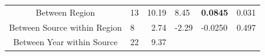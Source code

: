 \begin{longtable}[]{@{}clrllc@{}}
\begin{minipage}[b]{0.07\columnwidth}
\end{minipage}\tabularnewline
\midrule
\endhead
\begin{minipage}[t]{0.32\columnwidth}\centering\strut
Between Region\strut
\end{minipage} & \begin{minipage}[t]{0.06\columnwidth}\raggedright\strut
13\strut
\end{minipage} & \begin{minipage}[t]{0.07\columnwidth}\raggedleft\strut
10.19\strut
\end{minipage} & \begin{minipage}[t]{0.13\columnwidth}\raggedright\strut
8.45\strut
\end{minipage} & \begin{minipage}[t]{0.19\columnwidth}\raggedright\strut
\textbf{0.0845}\strut
\end{minipage} & \begin{minipage}[t]{0.07\columnwidth}\centering\strut
0.031\strut
\end{minipage}\tabularnewline
\begin{minipage}[t]{0.32\columnwidth}\centering\strut
Between Source within Region\strut
\end{minipage} & \begin{minipage}[t]{0.06\columnwidth}\raggedright\strut
8\strut
\end{minipage} & \begin{minipage}[t]{0.07\columnwidth}\raggedleft\strut
2.74\strut
\end{minipage} & \begin{minipage}[t]{0.13\columnwidth}\raggedright\strut
-2.29\strut
\end{minipage} & \begin{minipage}[t]{0.19\columnwidth}\raggedright\strut
-0.0250\strut
\end{minipage} & \begin{minipage}[t]{0.07\columnwidth}\centering\strut
0.497\strut
\end{minipage}\tabularnewline
\begin{minipage}[t]{0.32\columnwidth}\centering\strut
Between Year within Source\strut
\end{minipage} & \begin{minipage}[t]{0.06\columnwidth}\raggedright\strut
22\strut
\end{minipage} & \begin{minipage}[t]{0.07\columnwidth}\raggedleft\strut
9.37\strut
\end{minipage} & \begin{minipage}[t]{0.13\columnwidth}\raggedright\strut

\end{minipage}
\end{longtable}
